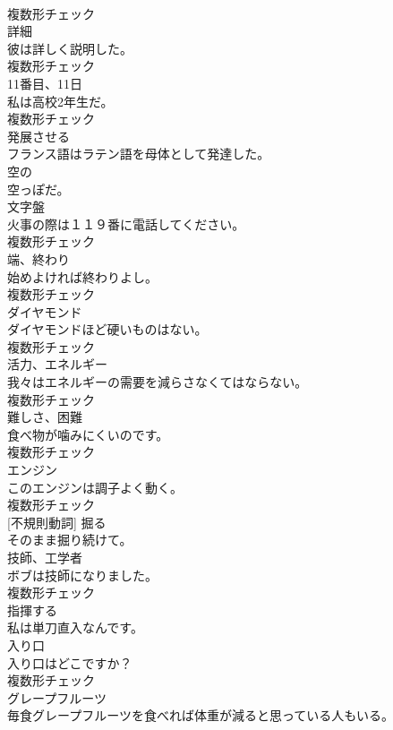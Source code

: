 \documentclass[8pt]{extreport}
\begin{document}
\begin{CJK}{UTF8}{min}
\\	複数形チェック
\\	[名詞]	詳細	
\\	彼は詳しく説明した。	
\\	複数形チェック
\\	[名詞]	11番目、11日	
\\	私は高校2年生だ。	
\\	複数形チェック
\\	[動詞]	発展させる	
\\	フランス語はラテン語を母体として発達した。	
\\	[形容詞]	空の	
\\	空っぽだ。	
\\	[名詞]	文字盤	
\\	火事の際は１１９番に電話してください。	
\\	複数形チェック
\\	[名詞]	端、終わり	
\\	始めよければ終わりよし。	
\\	複数形チェック
\\	[名詞]	ダイヤモンド	
\\	ダイヤモンドほど硬いものはない。	
\\	複数形チェック
\\	[名詞]	活力、エネルギー	
\\	我々はエネルギーの需要を減らさなくてはならない。	
\\	複数形チェック
\\	[名詞]	難しさ、困難	
\\	食べ物が噛みにくいのです。	
\\	複数形チェック
\\	[名詞]	エンジン	
\\	このエンジンは調子よく動く。	
\\	複数形チェック
\\	[動詞] [不規則動詞]	掘る	
\\	そのまま掘り続けて。	
\\	[名詞]	技師、工学者	
\\	ボブは技師になりました。	
\\	複数形チェック
\\	[動詞]	指揮する	
\\	私は単刀直入なんです。	
\\	[名詞]	入り口	
\\	入り口はどこですか？	
\\	複数形チェック
\\	[名詞]	グレープフルーツ	
\\	毎食グレープフルーツを食べれば体重が減ると思っている人もいる。	

\end{CJK}
\end{document}
